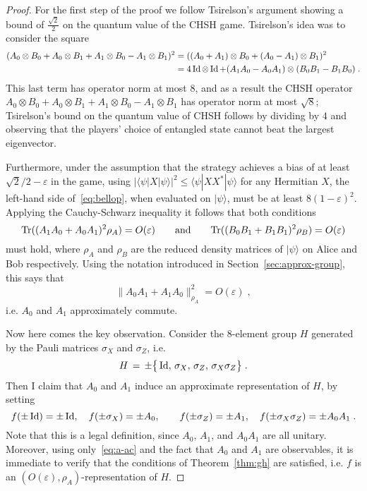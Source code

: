 \documentclass{report}
\theoremstyle{plain}
\theoremstyle{definition}
\theoremstyle{remark}
\newcommand{\ket}[1]{|#1\rangle}
\newcommand{\bra}[1]{\langle#1|}
\newcommand{\Tr}{\mbox{\rm Tr}}
\newcommand{\Id}{\ensuremath{\mathop{\rm Id}\nolimits}}
\newcommand{\eps}{\varepsilon}
\numberwithin{equation}{subsection}
\begin{document}
\begin{proof}
For the first step of the proof we follow Tsirelson's argument showing a bound of $\frac{\sqrt{2}}{2}$ on the quantum value of the CHSH game. Tsirelson's idea was to consider the square
\begin{align}
(A_0\otimes B_0 + A_0\otimes B_1 + A_1\otimes B_0 - A_1\otimes B_1 )^2 &=( (A_0+A_1)\otimes B_0 + (A_0-A_1)\otimes B_1 )^2\label{eq:bellop}\\
&= 4\Id\otimes \Id + (A_1A_0-A_0A_1)\otimes (B_0B_1-B_1B_0)\;.\notag
\end{align}
This last term has operator norm at most $8$, and as a result the CHSH operator $A_0\otimes B_0 + A_0\otimes B_1 + A_1\otimes B_0 - A_1\otimes B_1$ has operator norm at most $\sqrt{8}$; Tsirelson's bound on the quantum value of CHSH follows by dividing by $4$ and observing that the players' choice of entangled state cannot beat the largest eigenvector.

Furthermore, under the assumption that the strategy achieves a bias of at least $\sqrt{2}/2-\eps$ in the game, using $|\bra{\psi}X\ket{\psi}|^2 \leq \bra{\psi}XX^*\ket{\psi}$ for any Hermitian $X$, the left-hand side of~\eqref{eq:bellop}, when evaluated on $\ket{\psi}$, must be at least $8(1-\eps)^2$. Applying the Cauchy-Schwarz inequality it follows that both conditions
$$\Tr((A_1A_0 + A_0A_1)^2\rho_A) = O({\eps})\qquad \text{and}\qquad \Tr((B_0B_1+B_1B_1)^2 \rho_B) = O({\eps})$$
must hold, where $\rho_A$ and $\rho_B$ are the reduced density matrices of $\ket{\psi}$ on Alice and Bob respectively. 
Using the notation introduced in Section~\ref{sec:approx-group}, this says that 
\begin{equation}\label{eq:a-ac}
\|A_0A_1 + A_1A_0\|_{\rho_A}^2 = O({\eps})\;,
\end{equation}
 i.e. $A_0$ and $A_1$ approximately commute. 

Now here comes the key observation. Consider the $8$-element group $H$ generated by the Pauli matrices $\sigma_X$ and $\sigma_Z$, i.e. 
$$H\,=\,\pm\big\{ \Id,\, \sigma_X,\,\sigma_Z,\, \sigma_X\sigma_Z\big\}\;.$$
Then I claim that $A_0$ and $A_1$ induce an approximate representation of $H$, by setting 
$$ f(\pm \Id)=\pm\Id,\quad f(\pm\sigma_X)=\pm A_0,\quad\quad f(\pm\sigma_Z)=\pm A_1,\quad f(\pm\sigma_X\sigma_Z) = \pm A_0A_1\;.$$
Note that this is a legal definition, since $A_0$, $A_1$, and $A_0A_1$ are all unitary. Moreover, using only~\eqref{eq:a-ac} and the fact that $A_0$ and $A_1$ are observables, it is immediate to verify that the conditions of Theorem~\ref{thm:gh} are satisfied, i.e. $f$ is an $(O({\eps}),\rho_A)$-representation of $H$. 


\end{proof}
\end{document}
